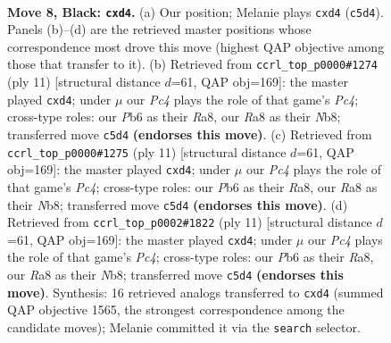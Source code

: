 \documentclass[11pt]{article}
\begin{document}
\begin{figure}[p]\centering
\begin{subfigure}{0.46\textwidth}\centering
\resizebox{\linewidth}{!}{%
\newchessgame
\chessboard[
  setfen={rnbq1rk1/p4ppp/1p2pn2/2pp4/PbPP3P/2NBPN2/1P3PP1/R1BQK2R b KQ - 0 8},
  showmover=false,
  pgfstyle=straightmove, color=movearrow, markmove={c5-d4}
]}
\caption{}
\end{subfigure}\hfill
\begin{subfigure}{0.46\textwidth}\centering
\resizebox{\linewidth}{!}{%
\newchessgame
\chessboard[
  setfen={rnbqk2r/pp3ppp/4pn2/2pp4/1bPP4/2NBPN2/PP3PPP/R1BQK2R b KQkq - 1 6},
  showmover=false,
  pgfstyle=straightmove, color=movearrow, markmove={c5-d4}
]}
\caption{}
\end{subfigure}
\\[4pt]
\begin{subfigure}{0.46\textwidth}\centering
\resizebox{\linewidth}{!}{%
\newchessgame
\chessboard[
  setfen={rnbqk2r/pp3ppp/4pn2/2pp4/1bPP4/2NBPN2/PP3PPP/R1BQK2R b KQkq - 1 6},
  showmover=false,
  pgfstyle=straightmove, color=movearrow, markmove={c5-d4}
]}
\caption{}
\end{subfigure}\hfill
\begin{subfigure}{0.46\textwidth}\centering
\resizebox{\linewidth}{!}{%
\newchessgame
\chessboard[
  setfen={rnbqk2r/pp3ppp/4pn2/2pp4/1bPP4/2NBPN2/PP3PPP/R1BQK2R b KQkq - 1 6},
  showmover=false,
  pgfstyle=straightmove, color=movearrow, markmove={c5-d4}
]}
\caption{}
\end{subfigure}
\caption{\textbf{Move 8, Black: \texttt{cxd4}.} (a) Our position; Melanie plays \texttt{cxd4} (\texttt{c5d4}). Panels (b)--(d) are the retrieved master positions whose correspondence most drove this move (highest QAP objective among those that transfer to it). (b) Retrieved from \texttt{ccrl\_top\_p0000\#1274} (ply 11) [structural distance $d$=61, QAP obj=169]: the master played \texttt{cxd4}; under $\mu$ our \emph{Pc4} plays the role of that game's \emph{Pc4}; cross-type roles: our \emph{P}b6 as their \emph{R}a8, our \emph{R}a8 as their \emph{N}b8; transferred move \texttt{c5d4} \textbf{(endorses this move)}. (c) Retrieved from \texttt{ccrl\_top\_p0000\#1275} (ply 11) [structural distance $d$=61, QAP obj=169]: the master played \texttt{cxd4}; under $\mu$ our \emph{Pc4} plays the role of that game's \emph{Pc4}; cross-type roles: our \emph{P}b6 as their \emph{R}a8, our \emph{R}a8 as their \emph{N}b8; transferred move \texttt{c5d4} \textbf{(endorses this move)}. (d) Retrieved from \texttt{ccrl\_top\_p0002\#1822} (ply 11) [structural distance $d$=61, QAP obj=169]: the master played \texttt{cxd4}; under $\mu$ our \emph{Pc4} plays the role of that game's \emph{Pc4}; cross-type roles: our \emph{P}b6 as their \emph{R}a8, our \emph{R}a8 as their \emph{N}b8; transferred move \texttt{c5d4} \textbf{(endorses this move)}. Synthesis: 16 retrieved analogs transferred to \texttt{cxd4} (summed QAP objective 1565, the strongest correspondence among the candidate moves); Melanie committed it via the \texttt{search} selector.}
\label{fig:thought-m15}
\end{figure}
\end{document}

